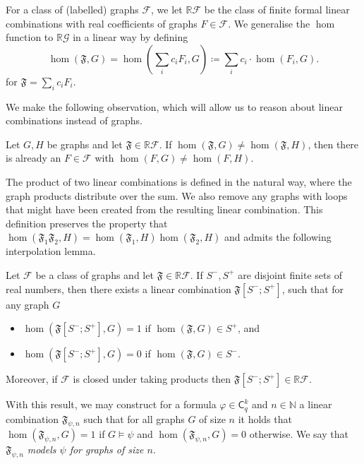 \documentclass[a4paper,UKenglish,cleveref, autoref, thm-restate]{lipics-v2021}
\renewcommand{\phi}{\varphi}
\newcommand{\R}{\ensuremath{\mathbb{R}}}
\newcommand{\N}{\ensuremath{\mathbb{N}}}
\newcommand{\CG}{\ensuremath{\mathcal G}}
\newcommand{\lC} {\ensuremath{\mathsf C}}
\newcommand{\qg}[1]{\ensuremath{\mathfrak{#1}}} \newcommand{\qgp}[3]{\ensuremath{\mathfrak{#1}[#3; #2]}}
\begin{document}
For a class of (labelled) graphs $\mathcal{F}$, we let $\R\mathcal{F}$ be the class of finite formal linear combinations with real coefficients of graphs $F \in \mathcal{F}$. We generalise the $\hom$ function to $\R\CG$ in a linear way by defining
\begin{equation*}
    \hom(\qg{F}, G) = \hom(\sum_i c_iF_i, G) \coloneqq \sum_i c_i \cdot \hom(F_i, G).
  \end{equation*}
for $\qg{F} = \sum_i c_iF_i$.

  We make the following observation, which will allow us to reason about linear combinations instead of graphs.

  \begin{observation}\label{prp:qgdistinguishing}
    Let $G, H$ be graphs and let $\qg{F} \in \R\mathcal{F}$. If $\hom(\qg{F}, G) \neq \hom(\qg{F}, H)$, then there is already an $F \in \mathcal{F}$ with $\hom(F, G) \neq \hom(F, H)$.
  \end{observation}

  The product of two linear combinations is defined in the natural way, where the graph products distribute over the sum. We also remove any graphs with loops that might have been created from the resulting linear combination. This definition preserves the property that $\hom(\qg{F}_1\qg{F}_2, H) = \hom(\qg{F}_1, H)\hom(\qg{F}_2, H)$ and admits the following interpolation lemma.

  \begin{lemma}
    \label{lem:qginterpolation}
  Let $\mathcal{F}$ be a class of graphs and let $\qg{F} \in \R\mathcal{F}$. If $S^-, S^+$ are disjoint finite sets of real numbers, then there exists a linear combination $\qgp{F}{S^+}{S^-}$, such that for any graph $G$
  \begin{itemize}
    \item $\hom(\qgp{F}{S^+}{S^-}, G) = 1$ if $\hom(\qg{F}, G) \in S^+$, and
    \item $\hom(\qgp{F}{S^+}{S^-}, G) = 0$ if $\hom(\qg{F}, G) \in S^-$.
  \end{itemize}
    Moreover, if $\mathcal{F}$ is closed under taking products then $\qgp{F}{S^+}{S^-} \in \R\mathcal{F}$.
  \end{lemma}

  With this result, we may construct for a formula $\phi \in \lC^k_q$ and $n \in \N$ a linear combination $\qg{F}_{\psi, n}$ such that for all graphs $G$ of size $n$ it holds that $\hom(\qg{F}_{\psi, n}, G) = 1$ if $G \models \psi$ and $\hom(\qg{F}_{\psi, n}, G) = 0$ otherwise. We say that $\qg{F}_{\psi, n}$ \emph{models $\psi$ for graphs of size $n$}.
\end{document}
